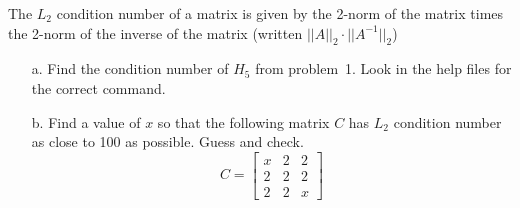 { The $L_2$ condition number of a matrix is given by the 2-norm of the matrix times the 2-norm of the inverse of the matrix (written $||A||_2 \cdot ||A^{-1}||_2$)
\begin{enumerate}
\item[a.] Find the condition number of $H_5$ from problem~1. Look in the help files for the correct command.
\item[b.] Find a value of $x$ so that the following matrix $C$ has $L_2$ condition number as close to 100 as possible.  Guess and check.
\[
C
=
\left[
\begin{array}{ccc}
x & 2 & 2\\
2 & 2 & 2\\ 
2 & 2 &  x
\end{array}
\right]
\]
\end{enumerate}}
{}